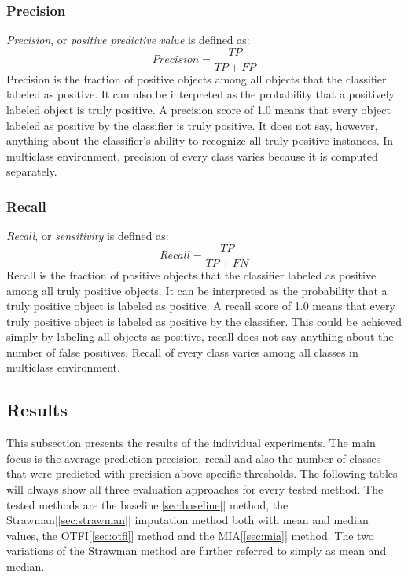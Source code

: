 \documentclass[11pt]{article}
\begin{document}
      \subsubsection{Precision}
        {\it Precision}, or {\it positive predictive value}\cite{confusion} is defined as:
        \begin{equation}
          Precision = \frac{TP}{TP + FP}
        \end{equation}
        Precision is the fraction of positive objects among all objects that the classifier labeled as positive. It can also be interpreted as the probability that a positively labeled object is truly positive. A precision score of 1.0 means that every object labeled as positive by the classifier is truly positive. It does not say, however, anything about the classifier's ability to recognize all truly positive instances. In multiclass environment, precision of every class varies because it is computed separately.
      \subsubsection{Recall}
        {\it Recall}, or {\it sensitivity}\cite{confusion} is defined as:
        \begin{equation}
          Recall = \frac{TP}{TP + FN}
        \end{equation}
        Recall is the fraction of positive objects that the classifier labeled as positive among all truly positive objects. It can be interpreted as the probability that a truly positive object is labeled as positive. A recall score of 1.0 means that every truly positive object is labeled as positive by the classifier. This could be achieved simply by labeling all objects as positive, recall does not say anything about the number of false positives. Recall of every class varies among all classes in multiclass environment.
    \subsection{Results}
      This subsection presents the results of the individual experiments. The main focus is the average prediction precision, recall and also the number of classes that were predicted with precision above specific thresholds. The following tables will always show all three evaluation approaches for every tested method. The tested methods are the baseline[\ref{sec:baseline}] method, the Strawman[\ref{sec:strawman}] imputation method both with mean and median values, the OTFI[\ref{sec:otfi}] method and the MIA[\ref{sec:mia}] method. The two variations of the Strawman method are further referred to simply as mean and median.
\end{document}
